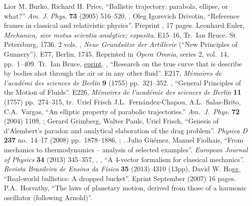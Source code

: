 \begin{thebibliography}{99}\footnotesize
{}
  Lior M. Burko, Richard H. Price,
  ``Ballistic trajectory: parabola, ellipse, or what?''
  \emph{Am. J. Phys.} {\bf 73} (2005) 516--520,
  . 
  Oleg Igorevich Drivotin,
  ``Reference frames in classical and relativistic physics''.
  Preprint , 17 pages.
  Leonhard Euler, 
  \emph{Mechanica, sive motus scientia analytice; expasita}.
  E15--16,
  Tr.\ Ian Bruce. St Petersburg, 1736. 2 vols.
  \bysame, 
  \emph{Neue Grunds\"atze der Artillerie} (``New Principles of Gunnery'').
  E77,
  Berlin, 1745. Reprinted in \emph{Opera Omnia}, series 2, vol.~14,
  pp.~1--409. Tr.\ Ian Bruce, \href{http://www.17centurymaths.com/contents/eulerartillery.htm}{eprint}.
  \bysame, 
  ``Research on the true curve that is describe by bodies shot through
  the air or in any other fluid''.
  E217,
  \emph{M\'emoires de l'acad\'emi des sciences de Berlin}
  \textbf{9} (1755) pp.~321--352.
  \bysame, 
  ``General Principles of the Motion of Fluids''.
  E226,
  \emph{M\'emoires de l'acad\'emie des sciences de Berlin}
  {\bf 11} (1757) pp.~274--315, tr.~Uriel Frisch
  J.L.\ Fern\'andez-Chapou, A.L.\ Salas-Brito, C.A.\ Vargas,
  ``An elliptic property of parabolic trajectories.''
  \emph{Am.\ J.\ Phys.} \textbf{72} (2004) 1109,
  ;
  Gerard Grimberg, Walter Pauls, Uriel Frisch,
  ``Genesis of d'Alembert's paradox and analytical elaboration of the drag problem''.
  \emph{Physica D} {\bf237} no.~14--17 (2008) pp.~1878--1886,
  ;
  .
  Julio G\"u\'emez, Manuel Fiolhais,
  ``From mechanics to thermodynamics -- analysis of selected examples''.
  \emph{European Journal of Physics} {\bf 34} (2013) 345--357,
  \bysame, \bysame,
  ``A 4-vector formalism for classical mechanics''.
  \emph{Revista Brasileira de Ensino da F\'isica} \textbf{35} 
  (2013) 4310 (13pp), 
  David W. Hogg, ``Real-world ballistics: A dropped bucket''.
  Eprint  September (2007) 16 pages.
  P.A.\ Horvathy,
  ``The laws of planetary motion, derived from those of a harmonic oscillator (following Arnold)''.

\end{thebibliography}
